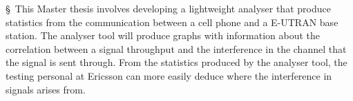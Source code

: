 \documentclass [cropmarks, frame, english, master]{idaexhibitpage}
\author {AUTHOR}
\begin{document}
\exhibitpagebeforeabstract 
\S  \ This Master thesis involves developing a lightweight analyser that produce statistics from the communication between a cell phone and a E-UTRAN base station. The analyser tool will produce graphs with information about the correlation between a signal throughput and the interference in the channel that the signal is sent through. From the statistics produced by the analyser tool, the testing personal at Ericsson can more easily deduce where the interference in signals arises from. 
\exhibitpageafterabstract 
\end{document}
